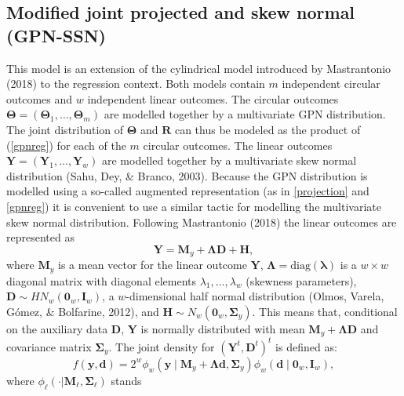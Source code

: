\documentclass[12pt,]{article}
\begin{document}
\subsection{Modified joint projected and skew normal (GPN-SSN)}\label{CL-GPN_multivariate}

This model is an extension of the cylindrical model introduced by
Mastrantonio (2018) to the regression context. Both models contain \(m\)
independent circular outcomes and \(w\) independent linear outcomes. The
circular outcomes
\(\boldsymbol{\Theta} = (\boldsymbol{\Theta}_1, \dots,  \boldsymbol{\Theta}_m)\)
are modelled together by a multivariate GPN distribution. The joint
distribution of \(\boldsymbol{\Theta}\) and \(\boldsymbol{R}\) can thus
be modeled as the product of (\ref{gpnreg}) for each of the \(m\)
circular outcomes. The linear outcomes
\(\boldsymbol{Y} = (\boldsymbol{Y}_1,  \dots, \boldsymbol{Y}_w)\) are
modelled together by a multivariate skew normal distribution (Sahu, Dey,
\& Branco, 2003). Because the GPN distribution is modelled using a
so-called augmented representation (as in \eqref{projection} and
\eqref{gpnreg}) it is convenient to use a similar tactic for modelling
the multivariate skew normal distribution. Following Mastrantonio (2018)
the linear outcomes are represented as
\[\boldsymbol{Y} = \boldsymbol{M}_y + \boldsymbol{\Lambda}\boldsymbol{D} + \boldsymbol{H},\]
\noindent where \(\boldsymbol{M}_y\) is a mean vector for the linear
outcome \(\boldsymbol{Y}\),
\(\boldsymbol{\Lambda} = \text{diag}(\boldsymbol{\lambda})\) is a
\(w \times w\) diagonal matrix with diagonal elements
\(\lambda_1, \dots, \lambda_w\) (skewness parameters),
\(\boldsymbol{D} \sim HN_w(\boldsymbol{0}_w, \boldsymbol{I}_w)\), a
\(w\)-dimensional half normal distribution (Olmos, Varela, Gómez, \&
Bolfarine, 2012), and
\(\boldsymbol{H} \sim N_w(\boldsymbol{0}_w, \boldsymbol{\Sigma}_y)\).
This means that, conditional on the auxiliary data \(\boldsymbol{D}\),
\(\boldsymbol{Y}\) is normally distributed with mean
\(\boldsymbol{M}_y + \boldsymbol{\Lambda}\boldsymbol{D}\) and covariance
matrix \(\boldsymbol{\Sigma}_y\). The joint density for
\((\boldsymbol{Y}^t, \boldsymbol{D}^t)^t\) is defined as:
\begin{equation}\label{YDjoint}
f(\boldsymbol{y}, \boldsymbol{d}) = 2^w\phi_w(\boldsymbol{y} \mid \boldsymbol{M}_y + \boldsymbol{\Lambda}\boldsymbol{d}, \boldsymbol{\Sigma}_y) \phi_w(\boldsymbol{d} \mid \boldsymbol{0}_w, \boldsymbol{I}_w),\nonumber
\end{equation} \noindent where
\(\phi_\ell(\cdot|\boldsymbol{M}_\ell,\boldsymbol{\Sigma}_\ell)\) stands
\end{document}

